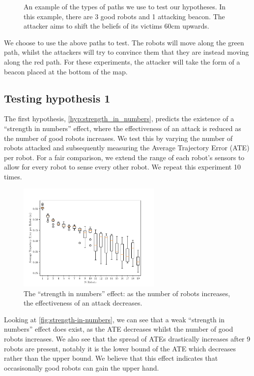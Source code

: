 \begin{figure}[!h]
	\centering
	

	\caption[Paths used to evaluate attackers]{An example of the types of paths we use to test our hypotheses. In this example, there are 3 good robots and 1 attacking beacon. The attacker aims to shift the beliefs of its victims 60cm upwards.}
\end{figure}

We choose to use the above paths to test. The robots will move along the green path, whilst the attackers will try to convince them that they are instead moving along the red path. For these experiments, the attacker will take the form of a beacon placed at the bottom of the map.


\subsection{Testing hypothesis 1}
The first hypothesis, \ref{hyp:strength_in_numbers}, predicts the existence of a ``strength in numbers'' effect, where the effectiveness of an attack is reduced as the number of good robots increases. We test this by varying the number of robots attacked and subsequently measuring the Average Trajectory Error (ATE) per robot. For a fair comparison, we extend the range of each robot's sensors to allow for every robot to sense every other robot. We repeat this experiment 10 times.
\begin{figure}[!h]
	\centering
        \includegraphics[width=7cm]{graphs/n_bots_all_loops.pdf}
	\caption{The ``strength in numbers'' effect: as the number of robots increases, the effectiveness of an attack decreases.}
	\label{fig:strength-in-numbers}
\end{figure}

Looking at \autoref{fig:strength-in-numbers}, we can see that a weak ``strength in numbers'' effect does exist, as the ATE decreases whilst the number of good robots increases. We also see that the spread of ATEs drastically increases after 9 robots are present, notably it is the lower bound of the ATE which decreases rather than the upper bound. We believe that this effect indicates that occasisonally good robots can gain the upper hand.

